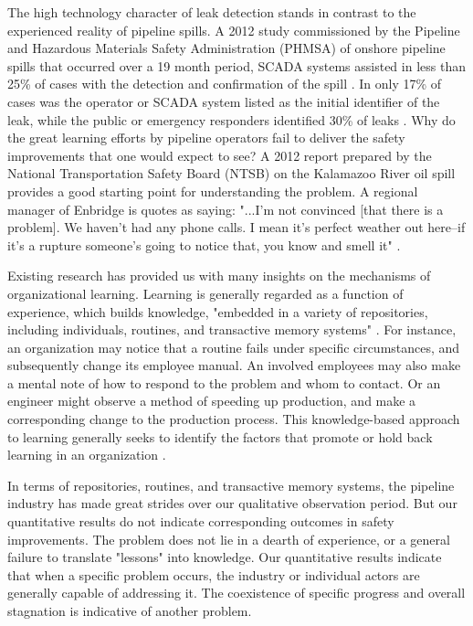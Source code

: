 \documentclass[12pt, man, natbib]{apa6}
\begin{document}
	The high technology character of leak detection stands in contrast to the experienced reality of pipeline spills. A 2012 study commissioned by the Pipeline and Hazardous Materials Safety Administration (PHMSA) of onshore pipeline spills that occurred over a 19 month period, SCADA systems assisted in less than 25\% of cases with the detection and confirmation of the spill \citep[p. 3-33]{Shaw2012}. In only 17\% of cases was the operator or SCADA system listed as the initial identifier of the leak, while the public or emergency responders identified 30\% of leaks \citep[p. 3-39]{Shaw2012}. Why do the great learning efforts by pipeline operators fail to deliver the safety improvements that one would expect to see? A 2012 report prepared by the National Transportation Safety Board (NTSB) on the Kalamazoo River oil spill provides a good starting point for understanding the problem. A regional manager of Enbridge is quotes as saying: "...I'm not convinced [that there is a problem]. We haven't had any phone calls. I mean it's perfect weather out here--if it's a rupture someone's going to notice that, you know and smell it" \citep[p. 100]{NTSB2012}.
	
	Existing research has provided us with many insights on the mechanisms of organizational learning. Learning is generally regarded as a function of experience, which builds knowledge, "embedded in a variety of repositories, including individuals, routines, and transactive memory systems" \citep[p. 1124]{Argote2011}. For instance, an organization may notice that a routine fails under specific circumstances, and subsequently change its employee manual. An involved employees may also make a mental note of how to respond to the problem and whom to contact. Or an engineer might observe a method of speeding up production, and make a corresponding change to the production process. This knowledge-based approach to learning generally seeks to identify the factors that promote or hold back learning in an organization \citep[e.g.,][p. 2]{Argote2013-1}.
	
	In terms of repositories, routines, and transactive memory systems, the pipeline industry has made great strides over our qualitative observation period. But our quantitative results do not indicate corresponding outcomes in safety improvements. The problem does not lie in a dearth of experience, or a general failure to translate "lessons" into knowledge. Our quantitative results indicate that when a specific problem occurs, the industry or individual actors are generally capable of addressing it. The coexistence of specific progress and overall stagnation is indicative of another problem.
	
\end{document}
